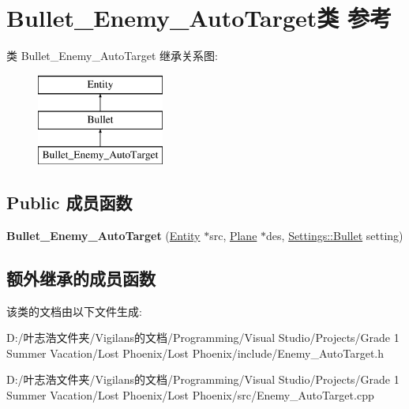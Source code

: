 \hypertarget{class_bullet___enemy___auto_target}{}\section{Bullet\+\_\+\+Enemy\+\_\+\+Auto\+Target类 参考}
\label{class_bullet___enemy___auto_target}
类 Bullet\+\_\+\+Enemy\+\_\+\+Auto\+Target 继承关系图\+:\begin{figure}[H]
\begin{center}
\leavevmode
\includegraphics[height=3.000000cm]{class_bullet___enemy___auto_target}
\end{center}
\end{figure}
\subsection*{Public 成员函数}
\begin{DoxyCompactItemize}
\item 
\mbox{\label{class_bullet___enemy___auto_target_ad2d9d9d8016dff0e1fd6f11c8800f314}} 
{\bfseries Bullet\+\_\+\+Enemy\+\_\+\+Auto\+Target} (\hyperlink{class_entity}{Entity} $\ast$src, \hyperlink{class_plane}{Plane} $\ast$des, \hyperlink{struct_settings_1_1_bullet}{Settings\+::\+Bullet} setting)
\end{DoxyCompactItemize}
\subsection*{额外继承的成员函数}


该类的文档由以下文件生成\+:\begin{DoxyCompactItemize}
\item 
D\+:/叶志浩文件夹/\+Vigilans的文档/\+Programming/\+Visual Studio/\+Projects/\+Grade 1 Summer Vacation/\+Lost Phoenix/\+Lost Phoenix/include/Enemy\+\_\+\+Auto\+Target.\+h\item 
D\+:/叶志浩文件夹/\+Vigilans的文档/\+Programming/\+Visual Studio/\+Projects/\+Grade 1 Summer Vacation/\+Lost Phoenix/\+Lost Phoenix/src/Enemy\+\_\+\+Auto\+Target.\+cpp\end{DoxyCompactItemize}
